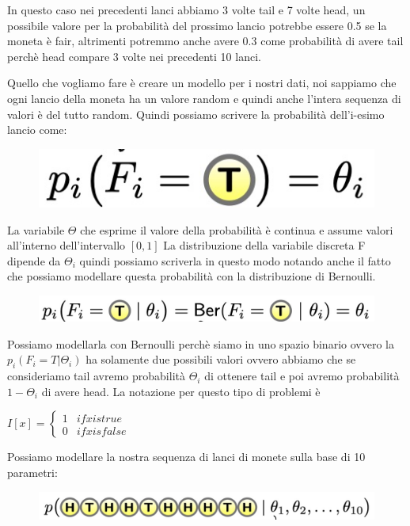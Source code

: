 \documentclass[14pt]{extreport}
\begin{document}
In questo caso nei precedenti lanci abbiamo 3 volte tail e 7 volte head, un possibile valore per la probabilità del prossimo lancio potrebbe essere
0.5 se la moneta è fair, altrimenti potremmo anche avere 0.3 come probabilità di avere tail perchè head compare 3 volte nei precedenti 10 lanci.

Quello che vogliamo fare è creare un modello per i nostri dati, noi sappiamo che ogni lancio della moneta ha un valore random e quindi anche l'intera
sequenza di valori è del tutto random. Quindi possiamo scrivere la probabilità dell'i-esimo lancio come:
\begin{figure}[H]
	\centering
	\includegraphics[width=0.3\linewidth]{7.jpeg}
\end{figure}

La variabile $\Theta$ che esprime il valore della probabilità è continua e assume valori all'interno dell'intervallo $[0,1]$ La distribuzione della
variabile discreta F dipende da $\Theta_i$ quindi possiamo scriverla in questo modo notando anche il fatto che possiamo modellare questa probabilità
con la distribuzione di Bernoulli.
\begin{figure}[H]
	\centering
	\includegraphics[width=0.6\linewidth]{8.jpeg}
\end{figure}

Possiamo modellarla con Bernoulli perchè siamo in uno spazio binario ovvero la $p_i(F_i = T | \Theta_i)$ ha solamente due possibili valori ovvero
abbiamo che se consideriamo tail avremo probabilità $\Theta_i$ di ottenere tail e poi avremo probabilità $1-\Theta_i$ di avere head. La notazione per
questo tipo di problemi è

$I[x] = \begin{cases*} 1 & if  x is true  \\
		0 & if 	x is false \end{cases*}$

Possiamo modellare la nostra sequenza di lanci di monete sulla base di 10 parametri:
\begin{figure}[H]
	\centering
	\includegraphics[width=0.8\linewidth]{9.jpeg}
\end{figure}
\end{document}
